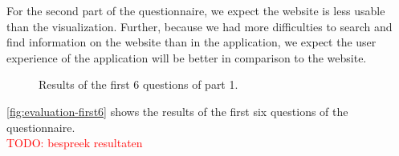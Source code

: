 For the second part of the questionnaire, we expect the website is less usable than the visualization. Further, because we had more difficulties to search and find information on the website than in the application, we expect the user experience of the application will be better in comparison to the website.

\begin{figure}[H]
	\centering
	\caption{Results of the first 6 questions of part 1.}
	\label{fig:evaluation-first6}
\end{figure}

\autoref{fig:evaluation-first6} shows the results of the first six questions of the questionnaire.\\

\textcolor{red}{TODO: bespreek resultaten}








